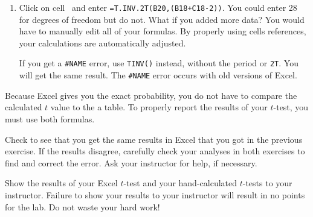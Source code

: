 \documentclass[12pt]{exam}
\newcommand*\xcell[1]{cell~\liningnum{#1}}
\begin{document}
\begin{enumerate}[resume]
	\item Click on \xcell{B21} and enter \texttt{=T.INV.2T(B20,(B18+C18-2))}. You could enter 28 for degrees of freedom but do not. What if you added more data? You would have to manually edit all of your formulas. By properly using cells references, your calculations are automatically adjusted. 
	
	If you get a \texttt{\#NAME} error, use \texttt{TINV()} instead, without the period or \texttt{2T}. You will get the same result. The \texttt{\#NAME} error occurs with old versions of Excel. 
\end{enumerate}
	
Because Excel gives you the exact probability, you do not have to compare the calculated $t$ value to the a table. To properly report the results of your $t$-test, you must use both formulas. 

\begin{questions}

\question
Check to see that you get the same results in Excel that you got in the previous exercise. If the results disagree, carefully check your analyses in both exercises to find and correct the error. Ask your instructor for help, if necessary.

\question[Checkout]
Show the results of your Excel $t$-test and your hand-calculated $t$-tests to your instructor. Failure to show your results to your instructor will result in no points for the lab. Do not waste your hard work!

\end{questions}
\end{document}
